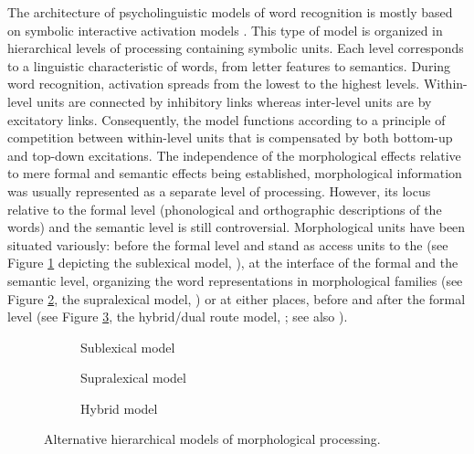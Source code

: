 \documentclass[output=paper]{langsci/langscibook}
\begin{document}
The architecture of psycholinguistic models of word recognition is
mostly based on symbolic interactive activation models %
\citep[e.g.][]{McClellandRumelhart1981}%
%
%
. This type of model is organized in hierarchical
levels of processing containing symbolic units. Each level corresponds
to a linguistic characteristic of words, from letter features to
semantics. During word recognition, activation spreads from the lowest
to the highest levels. Within-level units are connected by inhibitory
links whereas inter-level units are by excitatory links. Consequently,
the model functions according to a principle of competition between
within-level units that is compensated by both bottom-up and top-down
excitations. The independence of the morphological effects relative to
mere formal and semantic effects being established, morphological
information was usually represented as a separate level of processing.
However, its locus relative to the formal level (phonological and
orthographic descriptions of the words) and the semantic level is still
controversial. Morphological units have been situated variously: before the
formal level and stand as access units to the  (see Figure
\ref{fig:Giraudo:1A} depicting the sublexical model, %
\citealt{Taft1994}%
),  at the interface of
the formal and the semantic level, organizing the word representations
in morphological families (see Figure \ref{fig:Giraudo:1B}, the supralexical model, %
\citealt{GiraudoGrainger2001}%
) or at either places, before and after the formal
level (see Figure \ref{fig:Giraudo:1C}, the hybrid/dual route model, %
\citealt{Diependaele2009}
; see also %
\citealt{DiependaeleMorrisEtAl2013}%
).

\begin{figure}
  \smaller
\begin{subfigure}[t]{0.3\textwidth}

\caption{Sublexical model}\label{fig:Giraudo:1A}
\end{subfigure}\hspace*{0.5cm}%
\begin{subfigure}[t]{0.3\textwidth}

\caption{Supralexical model}\label{fig:Giraudo:1B}
\end{subfigure}\hspace*{0.5cm}%
\begin{subfigure}[t]{0.3\textwidth}

\caption{Hybrid model}\label{fig:Giraudo:1C}
\end{subfigure}
\caption{Alternative hierarchical models of morphological processing.} %
\label{fig:Giraudo:1}
\end{figure}
\end{document}
